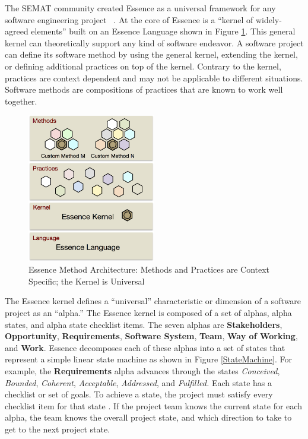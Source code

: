 \documentclass[preprint,12pt,3p]{elsarticle}
\begin{document}
The SEMAT community created Essence as a universal framework for any software engineering project ~\cite{JacobsonQueue}. At the core of Essence is a ``kernel of widely-agreed elements'' built on an Essence Language shown in Figure \ref{EssenceLayers}. This general kernel can theoretically support any kind of software endeavor. A software project can define its software method by using the general kernel, extending the kernel, or defining additional practices on top of the kernel. Contrary to the kernel, practices are context dependent and may not be applicable to different situations. Software methods are compositions of practices that are known to work well together.

\begin{figure}[h]\vspace*{4pt}
\centerline{\includegraphics[width=2.2in]{kernel_images/EssenceLayers}}
\caption{Essence Method Architecture: Methods and Practices are Context Specific; the Kernel is Universal}\vspace*{-6pt}\label{EssenceLayers}
\end{figure}

The Essence kernel defines a ``universal'' characteristic or dimension of a software project as an ``alpha.'' The Essence kernel is composed of a set of alphas, alpha states, and alpha state checklist items. The seven alphas are \textbf{Stakeholders}, \textbf{Opportunity}, \textbf{Requirements}, \textbf{Software System}, \textbf{Team}, \textbf{Way of Working}, and \textbf{Work}. Essence decomposes each of these alphas into a set of states that represent a simple linear state machine as shown in Figure \ref{StateMachine}. For example, the \textbf{Requirements} alpha advances through the states \textit{Conceived}, \textit{Bounded}, \textit{Coherent}, \textit{Acceptable}, \textit{Addressed}, and \textit{Fulfilled.} Each state has a checklist or set of goals. To achieve a state, the project must satisfy every checklist item for that state \cite{OMGStandard}. If the project team knows the current state for each alpha, the team knows the overall project state, and which direction to take to get to the next project state.
 
\end{document}
